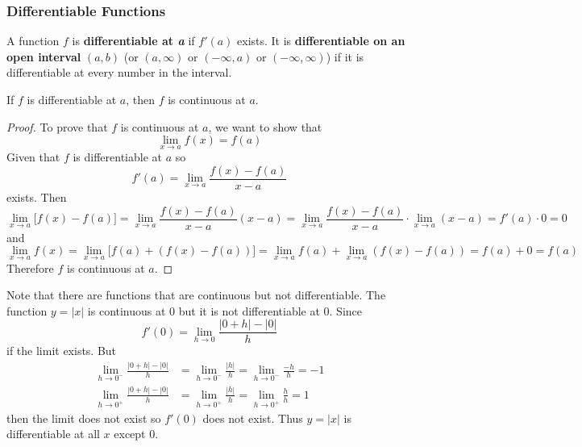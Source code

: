 \subsubsection*{Differentiable Functions}
\begin{definition}
    A function \(f\) is \textbf{differentiable at \textit{a}} if \(f'(a)\)
    exists.
    It is \textbf{differentiable on an open interval} \((a,b)\)
    (or \((a,\infty)\) or \((-\infty,a)\) or \((-\infty,\infty)\))
    if it is differentiable at every number in the interval.
\end{definition}
\begin{theorem}
    If \(f\) is differentiable at \(a\), then \(f\) is continuous at \(a\).
\end{theorem}
\begin{proof}
    To prove that \(f\) is continuous at \(a\),
    we want to show that
    \[\lim_{x\to a}f(x)=f(a)\]
    Given that \(f\) is differentiable at \(a\) so
    \[f'(a)=\lim_{x\to a}\frac{f(x)-f(a)}{x-a}\]
    exists.
    Then
    \[\lim_{x\to a}\bigl[f(x)-f(a)\bigr]
    =\lim_{x\to a}\frac{f(x)-f(a)}{x-a}(x-a)
    =\lim_{x\to a}\frac{f(x)-f(a)}{x-a}\cdot\lim_{x\to a}(x-a)
    =f'(a)\cdot 0=0\]
    and
    \[\lim_{x\to a}f(x)=\lim_{x\to a}\bigl[f(a)+(f(x)-f(a))\bigr]
    =\lim_{x\to a}f(a)+\lim_{x\to a}(f(x)-f(a))=f(a)+0=f(a)\]
    Therefore \(f\) is continuous at \(a\).
\end{proof}
Note that there are functions that are continuous but not differentiable.
The function \(y=|x|\) is continuous at 0 but it is not differentiable at 0.
Since
\[f'(0)=\lim_{h\to 0}\frac{|0+h|-|0|}{h}\] if the limit exists.
But
\begin{align*}
    \lim_{h\to 0^-}\frac{|0+h|-|0|}{h} &= \lim_{h\to 0^-}\frac{|h|}{h}
    =\lim_{h\to 0^-}\frac{-h}{h}=-1 \\
    \lim_{h\to 0^+}\frac{|0+h|-|0|}{h} &= \lim_{h\to 0^+}\frac{|h|}{h}
    =\lim_{h\to 0^+}\frac{h}{h}=1
\end{align*}
then the limit does not exist so \(f'(0)\) does not exist.
Thus \(y=|x|\) is differentiable at all \(x\) except 0.

